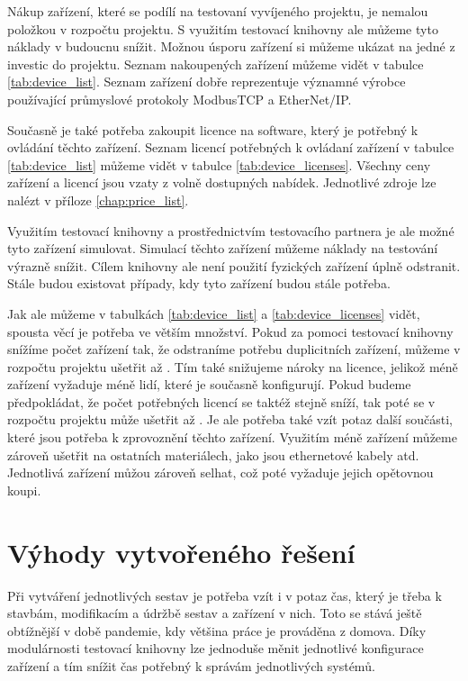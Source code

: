 Nákup zařízení, které se podílí na testovaní vyvíjeného projektu, je nemalou položkou v rozpočtu projektu. S využitím testovací knihovny ale můžeme tyto náklady v budoucnu snížit. Možnou úsporu zařízení si můžeme ukázat na jedné z investic do projektu. Seznam nakoupených zařízení můžeme vidět v tabulce \ref{tab:device_list}. Seznam zařízení dobře reprezentuje významné výrobce používající průmyslové protokoly ModbusTCP a EtherNet/IP.

Současně je také potřeba zakoupit licence na software, který je potřebný k ovládání těchto zařízení. Seznam licencí potřebných k ovládaní zařízení v tabulce \ref{tab:device_list} můžeme vidět v tabulce \ref{tab:device_licenses}. Všechny ceny zařízení a licencí jsou vzaty z volně dostupných nabídek. Jednotlivé zdroje lze nalézt v příloze \ref{chap:price_list}.

Využitím testovací knihovny a prostřednictvím testovacího partnera je ale možné tyto zařízení simulovat. Simulací těchto zařízení můžeme náklady na testování výrazně snížit. Cílem knihovny ale není použití fyzických zařízení úplně odstranit. Stále budou existovat případy, kdy tyto zařízení budou stále potřeba. 

Jak ale můžeme v tabulkách \ref{tab:device_list} a \ref{tab:device_licenses} vidět, spousta věcí je potřeba ve větším množství. Pokud za pomoci testovací knihovny snížíme počet zařízení tak, že odstraníme potřebu duplicitních zařízení, můžeme v rozpočtu projektu ušetřit až . Tím také snižujeme nároky na licence, jelikož méně zařízení vyžaduje méně lidí, které je současně konfigurují. Pokud budeme předpokládat, že počet potřebných licencí se taktéž stejně sníží, tak poté se v rozpočtu projektu může ušetřit až .
Je ale potřeba také vzít potaz další součásti, které jsou potřeba k zprovoznění těchto zařízení. Využitím méně zařízení můžeme zároveň ušetřit na ostatních materiálech, jako jsou ethernetové kabely atd. Jednotlivá zařízení můžou zároveň selhat, což poté vyžaduje jejich opětovnou koupi.

\section{Výhody vytvořeného řešení}
Při vytváření jednotlivých sestav je potřeba vzít i v potaz čas, který je třeba k stavbám, modifikacím a údržbě sestav a zařízení v nich. Toto se stává ještě obtížnější v době pandemie, kdy většina práce je prováděna z domova. Díky modulárnosti testovací knihovny lze jednoduše měnit jednotlivé konfigurace zařízení a tím snížit čas potřebný k správám jednotlivých systémů. 


